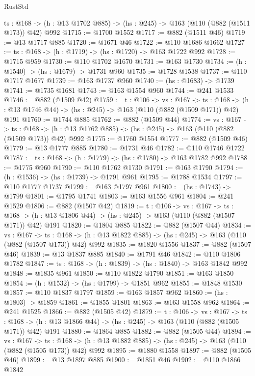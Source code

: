 \begin{lexlean}{RustStd}
\begin{coremodule}
  {ts : @168} -> (h : @13 @1702 @885) -> (hs : @245) -> @163 (@110 (@882 (@1511 @173)) @42) @992
@1715 := @1700 @1552
@1717 := @882 (@1511 @46)
@1719 := @13 @1717 @885
@1720 := @1671 @46
@1722 := @110 @1686 @1662
@1727 := {ts : @168} -> (h : @1719) -> (hs : @1720) -> @163 @1722 @992
@1728 := @1715 @959
@1730 := @110 @1702 @1670
@1731 := @163 @1730
@1734 := (h : @1540) -> (hs : @1679) -> @1731 @960
@1735 := @1728 @1538
@1737 := @110 @1717 @1677
@1739 := @163 @1737 @960
@1740 := (hs : @1683) -> @1739
@1741 := @1735 @1681
@1743 := @163 @1554 @960
@1744 := @241 @1533
@1746 := @882 (@1509 @42)
@1759 := {t : @106} ->
  {vs : @167} ->
  {ts : @168} -> (h : @13 @1746 @44) -> (hs : @245) -> @163 (@110 (@882 (@1509 @171)) @42) @191
@1760 := @1744 @885
@1762 := @882 (@1509 @44)
@1774 := {vs : @167} ->
  {ts : @168} -> (h : @13 @1762 @885) -> (hs : @245) -> @163 (@110 (@882 (@1509 @173)) @42) @992
@1775 := @1760 @1554
@1777 := @882 (@1509 @46)
@1779 := @13 @1777 @885
@1780 := @1731 @46
@1782 := @110 @1746 @1722
@1787 := {ts : @168} -> (h : @1779) -> (hs : @1780) -> @163 @1782 @992
@1788 := @1775 @960
@1790 := @110 @1762 @1730
@1791 := @163 @1790
@1794 := (h : @1536) -> (hs : @1739) -> @1791 @961
@1795 := @1788 @1534
@1797 := @110 @1777 @1737
@1799 := @163 @1797 @961
@1800 := (hs : @1743) -> @1799
@1801 := @1795 @1741
@1803 := @163 @1556 @961
@1804 := @241 @1529
@1806 := @882 (@1507 @42)
@1819 := {t : @106} ->
  {vs : @167} ->
  {ts : @168} -> (h : @13 @1806 @44) -> (hs : @245) -> @163 (@110 (@882 (@1507 @171)) @42) @191
@1820 := @1804 @885
@1822 := @882 (@1507 @44)
@1834 := {vs : @167} ->
  {ts : @168} -> (h : @13 @1822 @885) -> (hs : @245) -> @163 (@110 (@882 (@1507 @173)) @42) @992
@1835 := @1820 @1556
@1837 := @882 (@1507 @46)
@1839 := @13 @1837 @885
@1840 := @1791 @46
@1842 := @110 @1806 @1782
@1847 := {ts : @168} -> (h : @1839) -> (hs : @1840) -> @163 @1842 @992
@1848 := @1835 @961
@1850 := @110 @1822 @1790
@1851 := @163 @1850
@1854 := (h : @1532) -> (hs : @1799) -> @1851 @962
@1855 := @1848 @1530
@1857 := @110 @1837 @1797
@1859 := @163 @1857 @962
@1860 := (hs : @1803) -> @1859
@1861 := @1855 @1801
@1863 := @163 @1558 @962
@1864 := @241 @1525
@1866 := @882 (@1505 @42)
@1879 := {t : @106} ->
  {vs : @167} ->
  {ts : @168} -> (h : @13 @1866 @44) -> (hs : @245) -> @163 (@110 (@882 (@1505 @171)) @42) @191
@1880 := @1864 @885
@1882 := @882 (@1505 @44)
@1894 := {vs : @167} ->
  {ts : @168} -> (h : @13 @1882 @885) -> (hs : @245) -> @163 (@110 (@882 (@1505 @173)) @42) @992
@1895 := @1880 @1558
@1897 := @882 (@1505 @46)
@1899 := @13 @1897 @885
@1900 := @1851 @46
@1902 := @110 @1866 @1842

\end{coremodule}
\end{lexlean}
